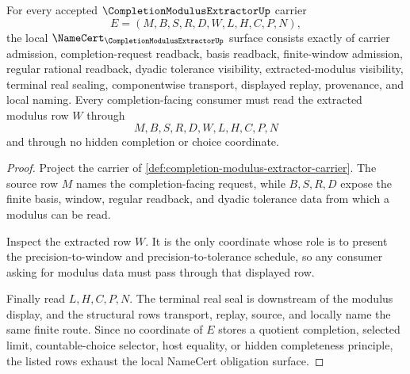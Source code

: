 \begin{theorem}
\label{thm:completion-modulus-extractor-namecert-obligations}
For every accepted $\CompletionModulusExtractorUp$ carrier
$$
E=(M,B,S,R,D,W,L,H,C,P,N),
$$
the local $\NameCert_{\CompletionModulusExtractorUp}$ surface consists exactly of carrier admission, completion-request readback, basis readback, finite-window admission, regular rational readback, dyadic tolerance visibility, extracted-modulus visibility, terminal real sealing, componentwise transport, displayed replay, provenance, and local naming. Every completion-facing consumer must read the extracted modulus row $W$ through
$$
M,B,S,R,D,W,L,H,C,P,N
$$
and through no hidden completion or choice coordinate.
\end{theorem}
\begin{proof}
Project the carrier of \autoref{def:completion-modulus-extractor-carrier}. The source row $M$ names the completion-facing request, while $B,S,R,D$ expose the finite basis, window, regular readback, and dyadic tolerance data from which a modulus can be read.

Inspect the extracted row $W$. It is the only coordinate whose role is to present the precision-to-window and precision-to-tolerance schedule, so any consumer asking for modulus data must pass through that displayed row.

Finally read $L,H,C,P,N$. The terminal real seal is downstream of the modulus display, and the structural rows transport, replay, source, and locally name the same finite route. Since no coordinate of $E$ stores a quotient completion, selected limit, countable-choice selector, host equality, or hidden completeness principle, the listed rows exhaust the local NameCert obligation surface.
\end{proof}

